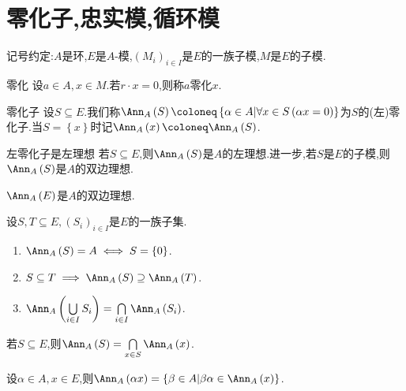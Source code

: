 \section{零化子,忠实模,循环模}

记号约定:$A$是环,$E$是$A$-模,$\left(M_{i}\right)_{i\in I}$是$E$的一族子模,$M$是$E$的子模.

\begin{definition}{零化}{}
	设$a\in A,x\in M$.若$r\cdot x=0$,则称$a$零化$x$.
\end{definition}

\begin{definition}{零化子}{}
	设$S\subseteq E$.我们称$\Ann_{A}\left(S\right)\coloneq\left\{\alpha\in A\middle|\forall x\in S\left(\alpha x=0\right)\right\}$为$S$的(左)零化子.当$S=\left\{x\right\}$时记$\Ann_{A}\left(x\right)\coloneq\Ann_{A}\left(S\right)$.
\end{definition}

\begin{proposition}{左零化子是左理想}{}
	若$S\subseteq E$,则$\Ann_{A}\left(S\right)$是$A$的左理想.进一步,若$S$是$E$的子模,则$\Ann_{A}\left(S\right)$是$A$的双边理想.
\end{proposition}

\begin{corollary}{}{}
	$\Ann_{A}\left(E\right)$是$A$的双边理想.
\end{corollary}

\begin{proposition}{}{}
	设$S,T\subseteq E,\left(S_{i}\right)_{i\in I}$是$E$的一族子集.
	\begin{enumerate}
		\item $\Ann_{A}\left(S\right)=A\iff S=\left\{0\right\}$.
		\item $S\subseteq T\implies \Ann_{A}\left(S\right)\supseteq\Ann_{A}\left(T\right)$.
		\item $\Ann_{A}\left(\bigcup\limits_{i\in I}S_{i}\right)=\bigcap\limits_{i\in I}\Ann_{A}\left(S_{i}\right)$.
	\end{enumerate}
\end{proposition}

\begin{corollary}{}{}
	若$S\subseteq E$,则$\Ann_{A}\left(S\right)=\bigcap\limits_{x\in S}\Ann_{A}\left(x\right)$.
\end{corollary}

\begin{proposition}{}{}
	设$\alpha\in A,x\in E$,则$\Ann_{A}\left(\alpha x\right)=\left\{\beta\in A\middle|\beta\alpha\in\Ann_{A}\left(x\right)\right\}$.
\end{proposition}

